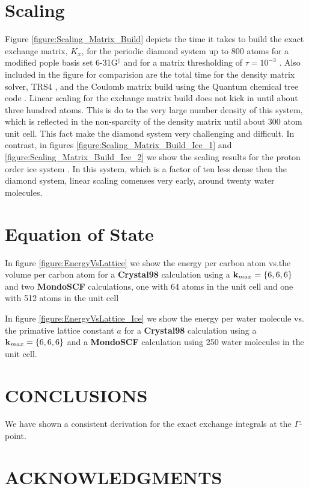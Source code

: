 \documentclass[prb,aps,nobibnotes,twocolumn,doublespace,twocolumngrid,superbib]{revtex4}
\begin{document}
\section{Scaling}
 
Figure \ref{figure:Scaling_Matrix_Build} depicts the time it takes to build the
exact exchange matrix,  \( K_{x} \), for the periodic diamond system up to 800 atoms for a modified pople 
basis set 6-31G$ ^\dagger$ \cite{Pople92} and for a matrix thresholding of $\tau=10^{-3}$ .
Also included in the figure for comparision are the total time for the
density matrix solver, TRS4 \cite{ANiklasson03}, 
and the Coulomb matrix build using the Quantum chemical tree code \cite{CTymczak03c}. Linear scaling
for the exchange matrix build does not kick in until about three hundred atoms. This is do to the 
very large number density of this system, which is reflected in the non-sparcity of the density matrix until 
about 300 atom unit cell. This fact make the diamond system very challenging and difficult. In contrast, in 
figures  \ref{figure:Scaling_Matrix_Build_Ice_1} and  \ref{figure:Scaling_Matrix_Build_Ice_2} we show the 
scaling results for the proton order ice system \cite{LOjamae94}. In this system, which is a factor of ten 
less dense then the diamond system, linear scaling comenses very early, around twenty water molecules. 
 
\section{Equation of State}

In figure \ref{figure:EnergyVsLattice} we show the energy per carbon atom vs.the volume per carbon atom for a
\textbf{Crystal98} calculation using a ${\bf k}_{max}=\{6,6,6\}$ and two \textbf{MondoSCF} calculations,
one with 64 atoms in the unit cell and one with 512 atoms in the unit cell

In figure \ref{figure:EnergyVsLattice_Ice} we show the energy per water molecule  vs. the primative 
lattice constant $a$ for a \textbf{Crystal98} calculation using a ${\bf k}_{max}=\{6,6,6\}$ and a 
\textbf{MondoSCF} calculation using 250 water molecules in the unit cell.


\section{CONCLUSIONS}
We have shown a consistent derivation for the exact exchange integrals at the $\Gamma$-point. 

\section*{ACKNOWLEDGMENTS}
\end{document}
